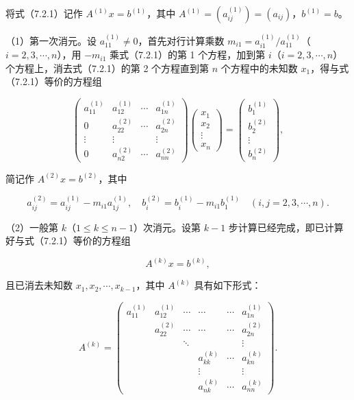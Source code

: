 \documentclass[
  10pt,
  fontset=fandol]{ctexart}
\begin{document}
将式（7.2.1）记作 \(A^{(1)}x=b^{(1)}\)，其中 \(A^{(1)}=(a_{ij}^{(1)})=(a_{ij})\)，\(b^{(1)}=b\)。

（1）第一次消元。设 \(a_{11}^{(1)}\ne0\)，首先对行计算乘数 \(m_{i1}=a_{i1}^{(1)}/a_{11}^{(1)}\)（\(i=2,3,\cdots,n\)），用 \(-m_{i1}\) 乘式（7.2.1）的第 1 个方程，加到第 \(i\)（\(i=2,3,\cdots,n\)）个方程上，消去式（7.2.1）的第 2 个方程直到第 \(n\) 个方程中的未知数 \(x_1\)，得与式（7.2.1）等价的方程组

\[
\begin{pmatrix}
a_{11}^{(1)}&a_{12}^{(1)}&\cdots&a_{1n}^{(1)}\\
0&a_{22}^{(2)}&\cdots&a_{2n}^{(2)}\\
\vdots&\vdots&&\vdots\\
0&a_{n2}^{(2)}&\cdots&a_{nn}^{(2)}
\end{pmatrix}
\begin{pmatrix}x_1\\x_2\\\vdots\\x_n\end{pmatrix}
=\begin{pmatrix}b_1^{(1)}\\b_2^{(2)}\\\vdots\\b_n^{(2)}\end{pmatrix},
\tag{7.2.7}
\]

简记作 \(A^{(2)}x=b^{(2)}\)，其中

\[
a_{ij}^{(2)}=a_{ij}^{(1)}-m_{i1}a_{1j}^{(1)},\quad
b_i^{(2)}=b_i^{(1)}-m_{i1}b_1^{(1)}\quad(i,j=2,3,\cdots,n).
\]

（2）一般第 \(k\)（\(1\le k\le n-1\)）次消元。设第 \(k-1\) 步计算已经完成，即已计算好与式（7.2.1）等价的方程组

\[A^{(k)}x=b^{(k)},\tag{7.2.8}\]

且已消去未知数 \(x_1,x_2,\cdots,x_{k-1}\)，其中 \(A^{(k)}\) 具有如下形式：

\[
A^{(k)}=\begin{pmatrix}
a_{11}^{(1)}&a_{12}^{(1)}&\cdots&\cdots&\cdots&a_{1n}^{(1)}\\
&a_{22}^{(2)}&\cdots&\cdots&\cdots&a_{2n}^{(2)}\\
&&\ddots&&&\vdots\\
&&&a_{kk}^{(k)}&\cdots&a_{kn}^{(k)}\\
&&&\vdots&&\vdots\\
&&&a_{nk}^{(k)}&\cdots&a_{nn}^{(k)}
\end{pmatrix}.
\]
\end{document}
